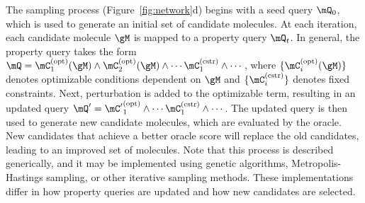The sampling process (Figure~\ref{fig:network}d) begins with a seed query $\mQ_0$, which is used to generate an initial set of candidate molecules.
At each iteration, each candidate molecule $\gM$ is mapped to a property query $\mQ_t$. In general, the property query takes the form
$\mQ = \mC^\text{(opt)}_1(\gM) \land \mC^\text{(opt)}_2(\gM) \land \cdots \mC^\text{(cstr)}_1 \land \cdots$,
where $\{ \mC^\text{(opt)}_i(\gM) \}$ denotes optimizable conditions dependent on $\gM$ and $\{ \mC^\text{(cstr)}_i \}$ denotes fixed constraints.
Next, perturbation is added to the optimizable term, resulting in an updated query
$\mQ' = {\mC'}^\text{(opt)}_1 \land \cdots \mC^\text{(cstr)}_1 \land \cdots$.
The updated query is then used to generate new candidate molecules, which are evaluated by the oracle.
New candidates that achieve a better oracle score will replace the old candidates, leading to an improved set of molecules.
Note that this process is described generically, and it may be implemented using genetic algorithms, Metropolis-Hastings sampling, or other iterative sampling methods. These implementations differ in how property queries are updated and how new candidates are selected.
